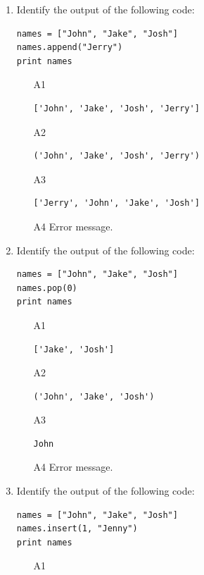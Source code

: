 \begin{enumerate}
\begin{enumerate}
\begin{verbatim}
Josh
\end{verbatim}
\item[A4] Error message.
\end{enumerate}
\item Identify the output of the following code:
\begin{verbatim}
names = ["John", "Jake", "Josh"]
names.append("Jerry")
print names
\end{verbatim}
\begin{enumerate}
\item[A1] 
\begin{verbatim}
['John', 'Jake', 'Josh', 'Jerry']
\end{verbatim}
\item[A2] 
\begin{verbatim}
('John', 'Jake', 'Josh', 'Jerry')
\end{verbatim}
\item[A3] 
\begin{verbatim}
['Jerry', 'John', 'Jake', 'Josh']
\end{verbatim}
\item[A4] Error message.
\end{enumerate}
\item Identify the output of the following code:
\begin{verbatim}
names = ["John", "Jake", "Josh"]
names.pop(0)
print names
\end{verbatim}
\begin{enumerate}
\item[A1] 
\begin{verbatim}
['Jake', 'Josh']
\end{verbatim}
\item[A2] 
\begin{verbatim}
('John', 'Jake', 'Josh')
\end{verbatim}
\item[A3] 
\begin{verbatim}
John
\end{verbatim}
\item[A4] Error message.
\end{enumerate}
\item Identify the output of the following code:
\begin{verbatim}
names = ["John", "Jake", "Josh"]
names.insert(1, "Jenny")
print names
\end{verbatim}
\begin{enumerate}
\item[A1] 
\begin{verbatim}

\end{verbatim}
\end{enumerate}
\end{enumerate}
